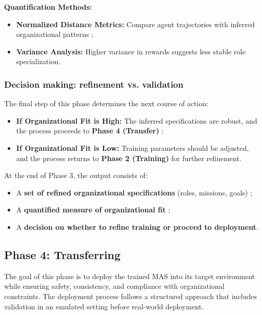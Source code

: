 \documentclass[pdflatex,sn-mathphys-num]{sn-jnl}%
\theoremstyle{thmstyleone}%
\theoremstyle{thmstyletwo}%
\theoremstyle{thmstylethree}%
\begin{document}
\noindent \textbf{Quantification Methods:}
\begin{itemize}
    \item \textbf{Normalized Distance Metrics:} Compare agent trajectories with inferred organizational patterns ;
    \item \textbf{Variance Analysis:} Higher variance in rewards suggests less stable role specialization.
\end{itemize}

\subsubsection{Decision making: refinement vs. validation}
The final step of this phase determines the next course of action:

\begin{itemize}
    \item \textbf{If Organizational Fit is High:} The inferred specifications are robust, and the process proceeds to \textbf{Phase 4 (Transfer)} ;
    \item \textbf{If Organizational Fit is Low:} Training parameters should be adjusted, and the process returns to \textbf{Phase 2 (Training)} for further refinement.
\end{itemize}

At the end of Phase 3, the output consists of:
\begin{itemize}
    \item A \textbf{set of refined organizational specifications} (roles, missions, goals) ;
    \item A \textbf{quantified measure of organizational fit} ;
    \item A \textbf{decision on whether to refine training or proceed to deployment}.
\end{itemize}

\subsection{Phase 4: Transferring}

The goal of this phase is to deploy the trained MAS into its target environment while ensuring safety, consistency, and compliance with organizational constraints. The deployment process follows a structured approach that includes validation in an emulated setting before real-world deployment.
\end{document}

